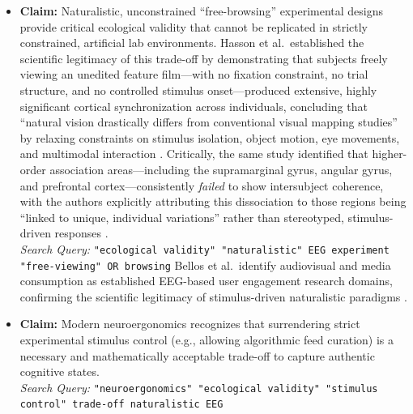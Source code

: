 \documentclass[12pt,a4paper]{report}
\begin{document}
\begin{itemize}
    \item \textbf{Claim:} Naturalistic, unconstrained ``free-browsing'' experimental designs provide critical ecological validity that cannot be replicated in strictly constrained, artificial lab environments. Hasson et al.\ established the scientific legitimacy of this trade-off by demonstrating that subjects freely viewing an unedited feature film---with no fixation constraint, no trial structure, and no controlled stimulus onset---produced extensive, highly significant cortical synchronization across individuals, concluding that ``natural vision drastically differs from conventional visual mapping studies'' by relaxing constraints on stimulus isolation, object motion, eye movements, and multimodal interaction \cite{hasson_intersubject_2004}. Critically, the same study identified that higher-order association areas---including the supramarginal gyrus, angular gyrus, and prefrontal cortex---consistently \textit{failed} to show intersubject coherence, with the authors explicitly attributing this dissociation to those regions being ``linked to unique, individual variations'' rather than stereotyped, stimulus-driven responses \cite{hasson_intersubject_2004}.\\
    \textit{Search Query:} \texttt{"ecological validity" "naturalistic" EEG experiment "free-viewing" OR browsing} Bellos et al.\ identify audiovisual and media consumption as established EEG-based user engagement research domains, confirming the scientific legitimacy of stimulus-driven naturalistic paradigms \cite{bellos_methods_2025}.

    \item \textbf{Claim:} Modern neuroergonomics recognizes that surrendering strict experimental stimulus control (e.g., allowing algorithmic feed curation) is a necessary and mathematically acceptable trade-off to capture authentic cognitive states.\\
    \textit{Search Query:} \texttt{"neuroergonomics" "ecological validity" "stimulus control" trade-off naturalistic EEG}
\end{itemize}
\end{document}
